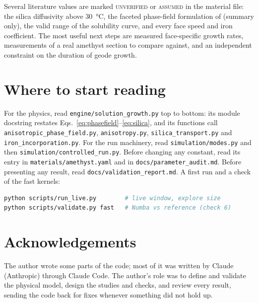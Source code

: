 \documentclass[11pt,a4paper]{article}
\newcommand{\code}[1]{\texttt{#1}}
\begin{document}
Several literature values are marked \textsc{unverified} or \textsc{assumed} in the material file: the silica diffusivity above \SI{30}{\celsius}, the faceted phase-field formulation of \citet{Debierre2003} (summary only), the valid range of the solubility curve, and every face speed and iron coefficient. The most useful next steps are measured face-specific growth rates, measurements of a real amethyst section to compare against, and an independent constraint on the duration of geode growth.

\section{Where to start reading}\label{sec:reading}

For the physics, read \code{engine/solution\_growth.py} top to bottom: its module docstring restates Eqs.~\eqref{eq:phasefield}--\eqref{eq:silica}, and its functions call \code{anisotropic\_phase\_field.py}, \code{anisotropy.py}, \code{silica\_transport.py} and \code{iron\_incorporation.py}. For the run machinery, read \code{simulation/modes.py} and then \code{simulation/controlled\_run.py}. Before changing any constant, read its entry in \code{materials/amethyst.yaml} and in \code{docs/parameter\_audit.md}. Before presenting any result, read \code{docs/validation\_report.md}. A first run and a check of the fast kernels:

\noindent\begin{minipage}{\linewidth}
\begin{lstlisting}[language=bash]
python scripts/run_live.py        # live window, explore size
python scripts/validate.py fast   # Numba vs reference (check 6)
\end{lstlisting}
\end{minipage}

\section*{Acknowledgements}
The author wrote some parts of the code; most of it was written by Claude (Anthropic) through Claude Code. The author's role was to define and validate the physical model, design the studies and checks, and review every result, sending the code back for fixes whenever something did not hold up.
\end{document}
